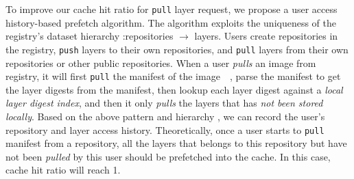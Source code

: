 To improve our cache hit ratio for \texttt{pull} layer request, we propose a user access history-based prefetch algorithm. The algorithm
exploits the uniqueness of the registry's 
dataset hierarchy
:repositories $\rightarrow$ layers.
Users create repositories in the registry, \texttt{push} layers to their own repositories,
and \texttt{pull} layers from their own repositories or other public repositories. 
When a user \emph{pulls} an image from registry, it will first \texttt{pull} the manifest of the image~\cite{docker}~\cite{dockerworkload},
parse the manifest to get the layer digests from the manifest,
then lookup each layer digest against a \emph{local layer digest index},
and then it only \emph{pulls} the layers that has \emph{not been stored locally}.
%
Based on the above 
pattern and hierarchy 
, we can record the user's repository and layer access history. 
Theoretically, once a user starts to \texttt{pull} manifest from a repository, all the layers that belongs to this repository but have not been \emph{pulled} by this user should be prefetched into the cache.
In this case, cache hit ratio will reach 1.


